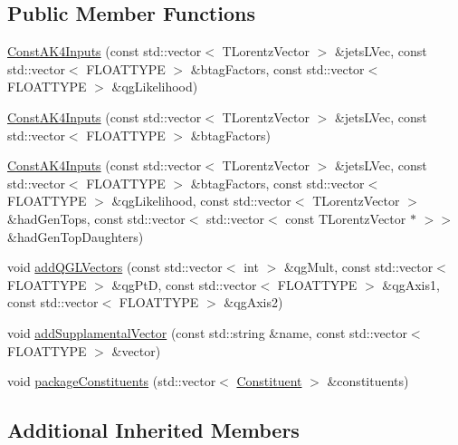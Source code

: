 \subsection*{Public Member Functions}
\begin{DoxyCompactItemize}
\item 
\hyperlink{classttUtility_1_1ConstAK4Inputs_a1c7cba3adee5f735134c23d20f30a397}{Const\-A\-K4\-Inputs} (const std\-::vector$<$ T\-Lorentz\-Vector $>$ \&jets\-L\-Vec, const std\-::vector$<$ F\-L\-O\-A\-T\-T\-Y\-P\-E $>$ \&btag\-Factors, const std\-::vector$<$ F\-L\-O\-A\-T\-T\-Y\-P\-E $>$ \&qg\-Likelihood)
\item 
\hyperlink{classttUtility_1_1ConstAK4Inputs_aeb8c14355009a3e7df17ae8db014ccc7}{Const\-A\-K4\-Inputs} (const std\-::vector$<$ T\-Lorentz\-Vector $>$ \&jets\-L\-Vec, const std\-::vector$<$ F\-L\-O\-A\-T\-T\-Y\-P\-E $>$ \&btag\-Factors)
\item 
\hyperlink{classttUtility_1_1ConstAK4Inputs_ac9906d074f5a43a6b609385ebb939204}{Const\-A\-K4\-Inputs} (const std\-::vector$<$ T\-Lorentz\-Vector $>$ \&jets\-L\-Vec, const std\-::vector$<$ F\-L\-O\-A\-T\-T\-Y\-P\-E $>$ \&btag\-Factors, const std\-::vector$<$ F\-L\-O\-A\-T\-T\-Y\-P\-E $>$ \&qg\-Likelihood, const std\-::vector$<$ T\-Lorentz\-Vector $>$ \&had\-Gen\-Tops, const std\-::vector$<$ std\-::vector$<$ const T\-Lorentz\-Vector $\ast$ $>$$>$ \&had\-Gen\-Top\-Daughters)
\item 
void \hyperlink{classttUtility_1_1ConstAK4Inputs_a4ed506e88c7e854713f52bf5f7f1652d}{add\-Q\-G\-L\-Vectors} (const std\-::vector$<$ int $>$ \&qg\-Mult, const std\-::vector$<$ F\-L\-O\-A\-T\-T\-Y\-P\-E $>$ \&qg\-Pt\-D, const std\-::vector$<$ F\-L\-O\-A\-T\-T\-Y\-P\-E $>$ \&qg\-Axis1, const std\-::vector$<$ F\-L\-O\-A\-T\-T\-Y\-P\-E $>$ \&qg\-Axis2)
\item 
void \hyperlink{classttUtility_1_1ConstAK4Inputs_aa7fc3fed9a160ab26cd77fd7c8b09565}{add\-Supplamental\-Vector} (const std\-::string \&name, const std\-::vector$<$ F\-L\-O\-A\-T\-T\-Y\-P\-E $>$ \&vector)
\item 
void \hyperlink{classttUtility_1_1ConstAK4Inputs_ab7827ad7b5906177068c107c4c8bb4d7}{package\-Constituents} (std\-::vector$<$ \hyperlink{classConstituent}{Constituent} $>$ \&constituents)
\end{DoxyCompactItemize}
\subsection*{Additional Inherited Members}



